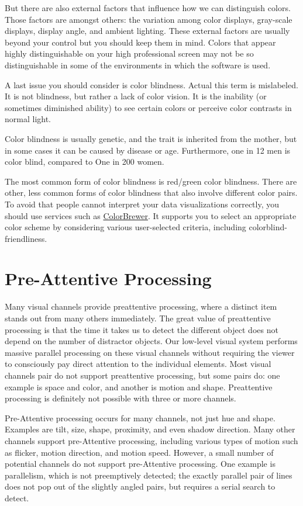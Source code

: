 \documentclass[
]{book}
\begin{document}
But there are also external factors that influence how we can distinguish colors. Those factors are amongst others: the variation among color displays, gray-scale displays, display angle, and ambient lighting. These external factors are usually beyond your control but you should keep them in mind. Colors that appear highly distinguishable on your high professional screen may not be so distinguishable in some of the environments in which the software is used.

A last issue you should consider is color blindness. Actual this term is mislabeled. It is not blindness, but rather a lack of color vision. It is the inability (or sometimes diminished ability) to see certain colors or perceive color contrasts in normal light.

Color blindness is usually genetic, and the trait is inherited from the mother, but in some cases it can be caused by disease or age. Furthermore, one in 12 men is color blind, compared to One in 200 women.

The most common form of color blindness is red/green color blindness. There are other, less common forms of color blindness that also involve different color pairs. To avoid that people cannot interpret your data visualizations correctly, you should use services such as \href{https://colorbrewer2.org}{ColorBrewer}. It supports you to select an appropriate color scheme by considering various user-selected criteria, including colorblind-friendliness.

\hypertarget{pre-attentive-processing}{%
\section{Pre-Attentive Processing}\label{pre-attentive-processing}}

Many visual channels provide preattentive processing, where a distinct item stands out from many others immediately. The great value of preattentive processing is that the time it takes us to detect the different object does not depend on the number of distractor objects. Our low-level visual system performs massive parallel processing on these visual channels without requiring the viewer to consciously pay direct attention to the individual elements. Most visual channels pair do not support preattentive processing, but some pairs do: one example is space and color, and another is motion and shape. Preattentive processing is definitely not possible with three or more channels.

Pre-Attentive processing occurs for many channels, not just hue and shape. Examples are tilt, size, shape, proximity, and even shadow direction. Many other channels support pre-Attentive processing, including various types of motion such as flicker, motion direction, and motion speed. However, a small number of potential channels do not support pre-Attentive processing. One example is parallelism, which is not preemptively detected; the exactly parallel pair of lines does not pop out of the slightly angled pairs, but requires a serial search to detect.
\end{document}
